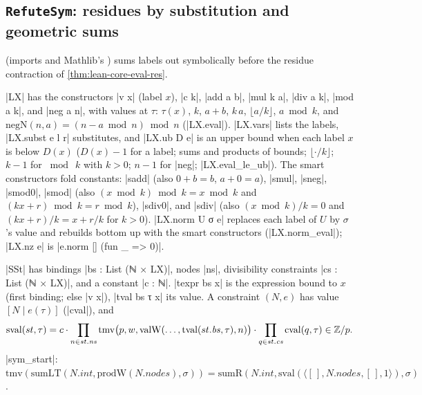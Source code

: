 \subsection{\texttt{RefuteSym}: residues by substitution and geometric sums}\label{sec:lean-core-refutesym}

 (imports  and Mathlib's ) sums labels out symbolically before the residue contraction of \cref{thm:lean-core-eval-res}.

\begin{definition}\label{def:lean-core-LX}
\lean|LX| has the constructors \lean|v x| (label $x$), \lean|c k|, \lean|add a b|, \lean|mul k a|, \lean|div a k|, \lean|mod a k|, and \lean|neg a n|, with values at $\tau$: $\tau(x)$, $k$, $a+b$, $k\,a$, $\lfloor a/k\rfloor$, $a\bmod k$, and $\mathrm{negN}(n,a)=(n-a\bmod n)\bmod n$ (\lean|LX.eval|). \lean|LX.vars| lists the labels, \lean|LX.subst e l r| substitutes, and \lean|LX.ub D e| is an upper bound when each label $x$ is below $D(x)$ ($D(x)-1$ for a label; sums and products of bounds; $\lfloor\cdot/k\rfloor$; $k-1$ for $\bmod\ k$ with $k>0$; $n-1$ for \lean|neg|; \lean|LX.eval_le_ub|). The smart constructors fold constants: \lean|sadd| (also $0+b=b$, $a+0=a$), \lean|smul|, \lean|sneg|, \lean|smod0|, \lean|smod| (also $(x\bmod k)\bmod k=x\bmod k$ and $(kx+r)\bmod k=r\bmod k$), \lean|sdiv0|, and \lean|sdiv| (also $(x\bmod k)/k=0$ and $(kx+r)/k=x+r/k$ for $k>0$). \lean|LX.norm U σ e| replaces each label of $U$ by $\sigma$'s value and rebuilds bottom up with the smart constructors (\lean|LX.norm_eval|); \lean|LX.nz e| is \lean|e.norm [] (fun _ => 0)|.
\end{definition}

\begin{definition}\label{def:lean-core-SSt}
\lean|SSt| has bindings \lean|bs : List (ℕ × LX)|, nodes \lean|ns|, divisibility constraints \lean|cs : List (ℕ × LX)|, and a constant \lean|c : ℕ|. \lean|texpr bs x| is the expression bound to $x$ (first binding; else \lean|v x|), \lean|tval bs τ x| its value. A constraint $(N,e)$ has value $[N\mid e(\tau)]$ (\lean|cval|), and
\[
\mathrm{sval}(st,\tau)=c\cdot\prod_{n\in st.\mathit{ns}}\mathrm{tmv}\bigl(p,w,\mathrm{valW}(\ldots,\mathrm{tval}(st.\mathit{bs},\tau),n)\bigr)\cdot\prod_{q\in st.\mathit{cs}}\mathrm{cval}(q,\tau)\in\mathbb{Z}/p.
\]
\lean|sym_start|: $\mathrm{tmv}(\mathrm{sumLT}(N.\mathit{int},\mathrm{prodW}(N.\mathit{nodes}),\sigma))=\mathrm{sumR}(N.\mathit{int},\mathrm{sval}(\langle[\,],N.\mathit{nodes},[\,],1\rangle),\sigma)$.
\end{definition}

